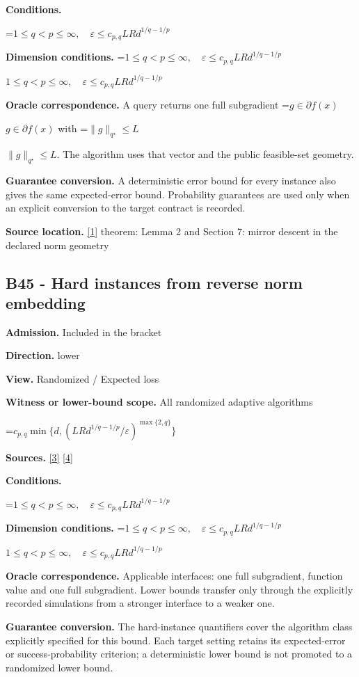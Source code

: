 \documentclass[10pt,a4paper]{article}
\newcommand{\AtlasMath}[1]{\par\begingroup\centering\setbox0=\hbox{$\displaystyle #1$}\ifdim\wd0>1.4\linewidth\typeout{ATLAS WIDE FORMULA: \the\wd0}\fi\ifdim\wd0>\linewidth\resizebox{\linewidth}{!}{\box0}\else\box0\fi\par\endgroup}
\newcommand{\AtlasInlineMath}[1]{\begingroup\setbox0=\hbox{$#1$}\ifdim\wd0>.4\linewidth\endgroup\AtlasMath{#1}\else\endgroup$#1$\fi}
\begin{document}
\textbf{Conditions.} 
\AtlasMath{1\le q<p\le\infty,\quad\varepsilon\le c_{p,q}LRd^{1/q-1/p}}


\textbf{Dimension conditions.} \AtlasInlineMath{1\le q<p\le\infty,\quad\varepsilon\le c_{p,q}LRd^{1/q-1/p}}

\textbf{Oracle correspondence.} A query returns one full subgradient \AtlasInlineMath{g\in\partial f(x)} with \AtlasInlineMath{\|g\|_{q^\star}\le L}. The algorithm uses that vector and the public feasible-set geometry.

\textbf{Guarantee conversion.} A deterministic error bound for every instance also gives the same expected-error bound. Probability guarantees are used only when an explicit conversion to the target contract is recorded.

\textbf{Source location.} \href{https://arxiv.org/pdf/1107.4080}{[1]} theorem: Lemma 2 and Section 7: mirror descent in the declared norm geometry

\subsection{B45 - Hard instances from reverse norm embedding}
\textbf{Admission.} Included in the bracket

\textbf{Direction.} lower

\textbf{View.} Randomized / Expected loss

\textbf{Witness or lower-bound scope.} All randomized adaptive algorithms

\AtlasMath{c_{p,q}\min\{d,(LRd^{1/q-1/p}/\varepsilon)^{\max\{2,q\}}\}}
\textbf{Sources.} \href{https://arxiv.org/pdf/2609.20701}{[3]} \href{https://arxiv.org/pdf/2609.20687}{[4]}

\textbf{Conditions.} 
\AtlasMath{1\le q<p\le\infty,\quad\varepsilon\le c_{p,q}LRd^{1/q-1/p}}


\textbf{Dimension conditions.} \AtlasInlineMath{1\le q<p\le\infty,\quad\varepsilon\le c_{p,q}LRd^{1/q-1/p}}

\textbf{Oracle correspondence.} Applicable interfaces: one full subgradient, function value and one full subgradient. Lower bounds transfer only through the explicitly recorded simulations from a stronger interface to a weaker one.

\textbf{Guarantee conversion.} The hard-instance quantifiers cover the algorithm class explicitly specified for this bound. Each target setting retains its expected-error or success-probability criterion; a deterministic lower bound is not promoted to a randomized lower bound.
\end{document}
